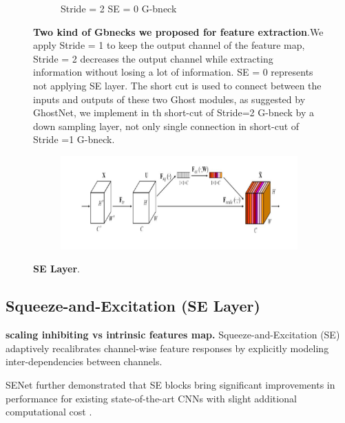 \begin{figure}[h]
\begin{center}
\begin{subfigure}[b]{0.49\textwidth}
			\caption{Stride = 2 SE = 0 G-bneck}
			\label{fig:cellnet}
		\end{subfigure}
	\end{center}
	\caption{\textbf{Two kind of Gbnecks we proposed for feature extraction}.We apply Stride = 1 to keep the output channel of the feature map, Stride = 2 decreases the output channel while extracting information without losing a lot of information. SE = 0 represents not applying SE layer.  The short cut is used to connect between the inputs and outputs of these two Ghost modules, as suggested by GhostNet, we implement in th short-cut of Stride=2 G-bneck by a down sampling layer, not only single connection in short-cut of Stride =1 G-bneck.}
\end{figure}

\begin{figure}[h]
	\begin{center}
		\begin{subfigure}[b]{\textwidth}
		    \centering
			\includegraphics[width=\textwidth]{thesis-template-master/images/SElayer.png}
			\label{fig:cellnet}
		\end{subfigure}
	\end{center}
	\caption{\textbf{SE Layer}.}
\end{figure}

\subsection{Squeeze-and-Excitation (SE Layer)} %
\label{sub:amet}

\textbf{scaling inhibiting vs intrinsic features map.} Squeeze-and-Excitation (SE)\cite{b24} adaptively recalibrates channel-wise feature responses by explicitly modeling inter-dependencies between channels. 

SENet further demonstrated that SE blocks bring significant improvements in performance for existing state-of-the-art CNNs with slight additional computational cost \cite{b24}. 



